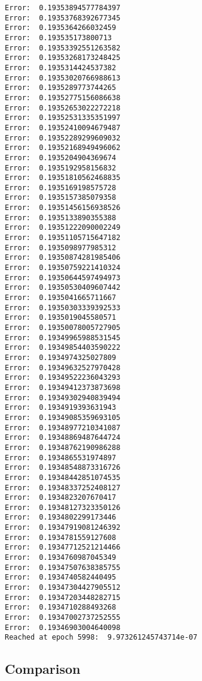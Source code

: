 \documentclass[11pt]{article}
\begin{document}
\begin{Verbatim}[commandchars=\\\{\}]
Error:  0.19353894577784397
Error:  0.19353768392677345
Error:  0.1935364266032459
Error:  0.193535173800713
Error:  0.19353392551263582
Error:  0.19353268173248425
Error:  0.1935314424537382
Error:  0.19353020766988613
Error:  0.1935289773744265
Error:  0.19352775156086638
Error:  0.19352653022272218
Error:  0.19352531335351997
Error:  0.19352410094679487
Error:  0.19352289299609032
Error:  0.19352168949496062
Error:  0.1935204904369674
Error:  0.1935192958156832
Error:  0.19351810562468835
Error:  0.1935169198575728
Error:  0.1935157385079358
Error:  0.19351456156938526
Error:  0.1935133890355388
Error:  0.19351222090002249
Error:  0.19351105715647182
Error:  0.1935098977985312
Error:  0.19350874281985406
Error:  0.19350759221410324
Error:  0.19350644597494973
Error:  0.19350530409607442
Error:  0.1935041665711667
Error:  0.19350303339392533
Error:  0.1935019045580571
Error:  0.19350078005727905
Error:  0.19349965988531545
Error:  0.19349854403590222
Error:  0.1934974325027809
Error:  0.19349632527970428
Error:  0.19349522236043293
Error:  0.19349412373873698
Error:  0.19349302940839494
Error:  0.1934919393631943
Error:  0.19349085359693105
Error:  0.19348977210341087
Error:  0.19348869487644724
Error:  0.19348762190986288
Error:  0.1934865531974897
Error:  0.19348548873316726
Error:  0.19348442851074535
Error:  0.19348337252408127
Error:  0.1934823207670417
Error:  0.19348127323350126
Error:  0.1934802299173446
Error:  0.19347919081246392
Error:  0.1934781559127608
Error:  0.19347712521214466
Error:  0.1934760987045349
Error:  0.19347507638385755
Error:  0.1934740582440495
Error:  0.19347304427905512
Error:  0.19347203448282715
Error:  0.1934710288493268
Error:  0.19347002737252555
Error:  0.19346903004640098
Reached at epoch 5998:  9.973261245743714e-07
    \end{Verbatim}

    \hypertarget{comparison}{%
\subsection{Comparison}\label{comparison}}
\end{document}
